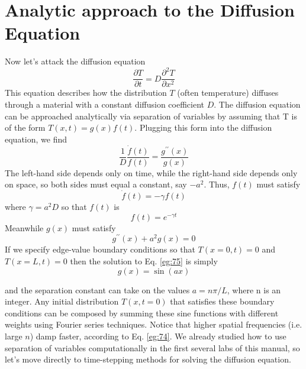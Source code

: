 \documentclass{book}
\theoremstyle{plain}
\theoremstyle{definition}
\numberwithin{exm}{chapter}
\theoremstyle{remark}
\theoremstyle{summary}
\theoremstyle{overview}
\begin{document}
\section*{Analytic approach to the Diffusion Equation}

Now let\rq s attack the diffusion equation
\begin{equation}\label{eq:71}
\frac{\partial T}{\partial t}=D \frac{\partial^{2} T}{\partial x^{2}}
\end{equation}
This equation describes how the distribution $T$ (often temperature) diffuses
through a material with a constant diffusion coefficient $D$. The diffusion equation
can be approached analytically via separation of variables by assuming that T is
of the form $T(x,t) = g(x)f(t)$. Plugging this form into the diffusion equation, we
find
\begin{equation}\label{eq:72}
\frac{1}{D} \frac{\dot{f}(t)}{f(t)}=\frac{g^{\prime \prime}(x)}{g(x)}
\end{equation}
The left-hand side depends only on time, while the right-hand side depends only
on space, so both sides must equal a constant, say $-a^2$. Thus, $f (t)$ must satisfy
\begin{equation}\label{eq:73}
\dot{f}(t)=-\gamma f(t)
\end{equation}
where $ \gamma = a^2 D$ so that $f(t)$ is
\begin{equation}\label{eq:74}
f(t)=e^{-\gamma t}
\end{equation}
Meanwhile $g(x)$ must satisfy
\begin{equation}\label{eq:75}
g^{\prime \prime}(x)+a^{2} g(x)=0
\end{equation}
If we specify edge-value boundary conditions so that $T(x = 0,t) = 0$ and $T(x =
L,t) = 0$ then the solution to Eq. \eqref{eg:75} is simply
\begin{equation}\label{eq:76}
g(x) = \sin(ax)
\end{equation}

and the separation constant can take on the values $a = n \pi /L$, where n is an integer.
Any initial distribution $T(x,t = 0)$ that satisfies these boundary conditions can be
composed by summing these sine functions with different weights using Fourier
series techniques. Notice that higher spatial frequencies (i.e. large $n$) damp faster,
according to Eq. \eqref{eg:74}. We already studied how to use separation of variables
computationally in the first several labs of this manual, so let\rq s move directly to
time-stepping methods for solving the diffusion equation.
\end{document}
